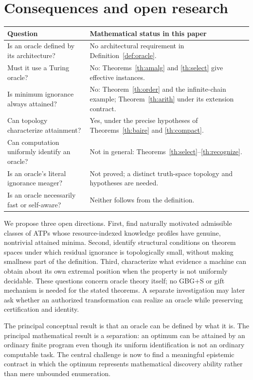 \documentclass[11pt]{article}
\begin{document}
\section{Consequences and open research}
\begin{tabularx}{\linewidth}{@{}p{.34\linewidth}X@{}}\toprule
Question & Mathematical status in this paper\\\midrule
Is an oracle defined by its architecture? & No architectural requirement in Definition~\ref{def:oracle}.\\
Must it use a Turing oracle? & No: Theorems~\ref{th:amalg} and \ref{th:select} give effective instances.\\
Is minimum ignorance always attained? & No: Theorem~\ref{th:order} and the infinite-chain example; Theorem~\ref{th:arith} under its extension contract.\\
Can topology characterize attainment? & Yes, under the precise hypotheses of Theorems~\ref{th:baire} and \ref{th:compact}.\\
Can computation uniformly identify an oracle? & Not in general: Theorems~\ref{th:select}--\ref{th:recognize}.\\
Is an oracle's literal ignorance meager? & Not proved; a distinct truth-space topology and hypotheses are needed.\\
Is an oracle necessarily fast or self-aware? & Neither follows from the definition.\\\bottomrule
\end{tabularx}

We propose three open directions. First, find naturally motivated admissible classes of ATPs whose resource-indexed knowledge profiles have genuine, nontrivial attained minima. Second, identify structural conditions on theorem spaces under which residual ignorance is topologically small, without making smallness part of the definition. Third, characterize what evidence a machine can obtain about its own extremal position when the property is not uniformly decidable. These questions concern oracle theory itself; no GBG+S or gift mechanism is needed for the stated theorems. A separate investigation may later ask whether an authorized transformation can realize an oracle while preserving certification and identity.

The principal conceptual result is that an oracle can be defined by what it is. The principal mathematical result is a separation: an optimum can be attained by an ordinary finite program even though its uniform identification is not an ordinary computable task. The central challenge is now to find a meaningful epistemic contract in which the optimum represents mathematical discovery ability rather than mere unbounded enumeration.
\end{document}

